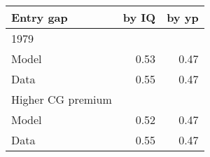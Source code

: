 \begin{tabular}{lrr}
\hline
Entry gap & by IQ  & by yp  \\ 
\hline
1979 &   &   \\ 
Model & 0.53  & 0.47  \\ 
Data & 0.55  & 0.47  \\ 
Higher CG premium &   &   \\ 
Model & 0.52  & 0.47  \\ 
Data & 0.55  & 0.47  \\ 
\hline
\end{tabular}%
